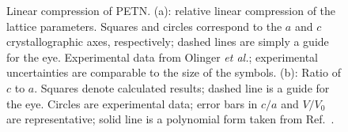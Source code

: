 \documentclass[prb,aps,nobibnotes,twocolumn,doublespace,twocolumngrid,superbib]{revtex4}
\begin{document}
\begin{figure}
\caption{Linear compression of PETN.  (a): relative linear compression
of the lattice parameters. Squares and circles correspond to the $a$
and $c$ crystallographic axes, respectively; dashed lines are simply a
guide for the eye.  Experimental data from Olinger {\it et
al.}\cite{Olinger_1975v62}; experimental uncertainties are comparable
to the size of the symbols. (b): Ratio of $c$ to $a$.  Squares denote
calculated results; dashed line is a guide for the eye.  Circles are
experimental data;\cite{Olinger_1975v62} error bars in $c/a$ and
$V/V_0$ are representative; solid line is a polynomial form taken from
Ref.~\cite{Olinger_1975v62}.  }
\label{fig:linear_compress}
\end{figure}

\end{document}
